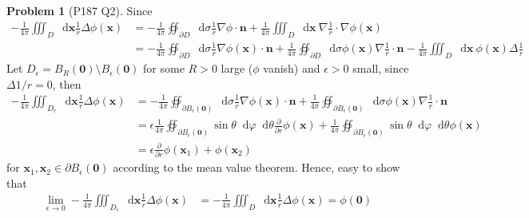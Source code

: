 \documentclass[twoside,11pt]{article}
\renewcommand*\d{\mathop{}\!\mathrm{d}}
\theoremstyle{definition}
\newtheorem{problem}{Problem}
\theoremstyle{remark}
\begin{document}
\begin{problem}[P187 Q2]
Since
\begin{align*}
    -\frac{1}{4\pi}\iiint_D\d\mathbf{x}\frac{1}{r}\Delta\phi(\mathbf{x})
    &= 
    -\frac{1}{4\pi}\oiint_{\partial D}\d\sigma\frac{1}{r}\nabla\phi\cdot\mathbf{n}
    + \frac{1}{4\pi}\iiint_D\d\mathbf{x}\ \nabla\frac{1}{r}\cdot\nabla\phi(\mathbf{x})\\
    &= -\frac{1}{4\pi}\oiint_{\partial D}\d\sigma\frac{1}{r}\nabla\phi(\mathbf{x})\cdot\mathbf{n}
    + \frac{1}{4\pi}\oiint_{\partial D}\d\sigma \phi(\mathbf{x})\nabla\frac{1}{r}\cdot\mathbf{n}
    - \frac{1}{4\pi}\iiint_D\d\mathbf{x}\ \phi(\mathbf{x})\Delta\frac{1}{r}
\end{align*}
Let $D_\epsilon=B_R(\mathbf{0})\setminus B_\epsilon(\mathbf{0})$ for some $R>0$ large ($\phi$ vanish) 
and $\epsilon > 0$ small, since $\Delta 1/r=0$, then
\begin{align*}
    -\frac{1}{4\pi}\iiint_{D_\epsilon}\d\mathbf{x}\frac{1}{r}\Delta\phi(\mathbf{x})
    &= 
    - \frac{1}{4\pi}\oiint_{\partial B_\epsilon(\mathbf{0})}
    \d\sigma\frac{1}{r}\nabla\phi(\mathbf{x})\cdot\mathbf{n}
    + \frac{1}{4\pi}\oiint_{\partial B_\epsilon(\mathbf{0})}
    \d\sigma\phi(\mathbf{x})\nabla\frac{1}{r}\cdot\mathbf{n}\\
    &= 
    \epsilon\frac{1}{4\pi}\oiint_{\partial B_\epsilon(\mathbf{0})}
    \sin\theta\d\varphi\d\theta
    \frac{\partial }{\partial r}\phi(\mathbf{x})  
    + \frac{1}{4\pi}\oiint_{\partial B_\epsilon(\mathbf{0})}
    \sin\theta\d\varphi\d\theta \phi(\mathbf{x})\\
    &= \epsilon \frac{\partial}{\partial r}\phi(\mathbf{x}_1)
    + \phi(\mathbf{x}_2)
\end{align*}
for $\mathbf{x}_1,\mathbf{x}_2\in \partial B_\epsilon(\mathbf{0})$ according 
to the mean value theorem.
Hence, easy to show that
\begin{align*} 
    \lim_{\epsilon\rightarrow 0}
    -\frac{1}{4\pi}\iiint_{D_\epsilon}\d\mathbf{x}\frac{1}{r}\Delta\phi(\mathbf{x})
    &= 
    -\frac{1}{4\pi}\iiint_D\d\mathbf{x}\frac{1}{r}\Delta\phi(\mathbf{x})
    = 
    \phi(\mathbf{0})
\end{align*}

\end{problem}
\end{document}
